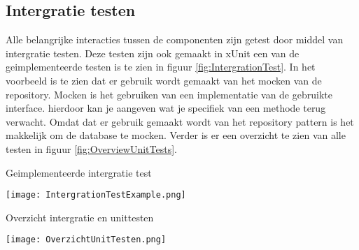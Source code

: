 \subsection{Intergratie testen}
Alle belangrijke interacties tussen de componenten zijn getest door middel van intergratie testen.
Deze testen zijn ook gemaakt in xUnit een van de geimplementeerde testen is te zien in figuur \ref{fig:IntergrationTest}.
In het voorbeeld is te zien dat er gebruik wordt gemaakt van het mocken van de repository.
Mocken is het gebruiken van een  implementatie van de gebruikte interface. 
hierdoor kan je aangeven wat je specifiek van een methode terug verwacht.
Omdat dat er gebruik gemaakt wordt van het repository pattern is het makkelijk om de database te mocken.
Verder is er een overzicht te zien van alle testen in figuur \ref{fig:OverviewUnitTests}.


\whitespace[2]
\begin{graphic}
	\captionsetup{type=figure}
	\caption{Geimplementeerde intergratie test}
	\texttt{[image: IntergrationTestExample.png]}
	\label{fig:IntergrationTest}
\end{graphic}

\whitespace[2]
\begin{graphic}
	\captionsetup{type=figure}
	\caption{Overzicht intergratie en unittesten}
	\texttt{[image: OverzichtUnitTesten.png]}
	\label{fig:OverviewUnitTests}
\end{graphic}
